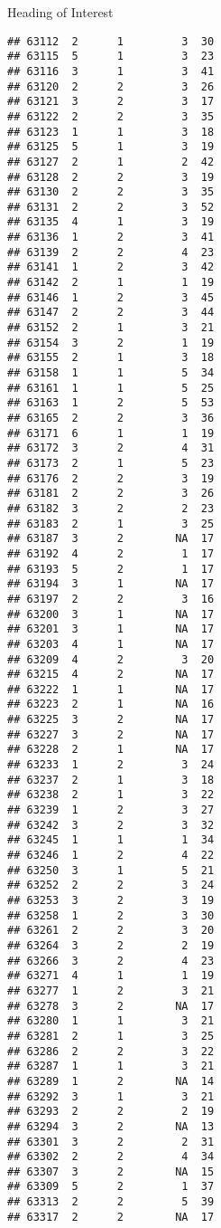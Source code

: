 \documentclass[
  ignorenonframetext,
]{beamer}
\begin{document}
\begin{frame}[fragile]{Heading of Interest}
\begin{verbatim}
## 63112  2      1         3  30
## 63115  5      1         3  23
## 63116  3      1         3  41
## 63120  2      2         3  26
## 63121  3      2         3  17
## 63122  2      2         3  35
## 63123  1      1         3  18
## 63125  5      1         3  19
## 63127  2      1         2  42
## 63128  2      2         3  19
## 63130  2      2         3  35
## 63131  2      2         3  52
## 63135  4      1         3  19
## 63136  1      2         3  41
## 63139  2      2         4  23
## 63141  1      2         3  42
## 63142  2      1         1  19
## 63146  1      2         3  45
## 63147  2      2         3  44
## 63152  2      1         3  21
## 63154  3      2         1  19
## 63155  2      1         3  18
## 63158  1      1         5  34
## 63161  1      1         5  25
## 63163  1      2         5  53
## 63165  2      2         3  36
## 63171  6      1         1  19
## 63172  3      2         4  31
## 63173  2      1         5  23
## 63176  2      2         3  19
## 63181  2      2         3  26
## 63182  3      2         2  23
## 63183  2      1         3  25
## 63187  3      2        NA  17
## 63192  4      2         1  17
## 63193  5      2         1  17
## 63194  3      1        NA  17
## 63197  2      2         3  16
## 63200  3      1        NA  17
## 63201  3      1        NA  17
## 63203  4      1        NA  17
## 63209  4      2         3  20
## 63215  4      2        NA  17
## 63222  1      1        NA  17
## 63223  2      1        NA  16
## 63225  3      2        NA  17
## 63227  3      2        NA  17
## 63228  2      1        NA  17
## 63233  1      2         3  24
## 63237  2      1         3  18
## 63238  2      1         3  22
## 63239  1      2         3  27
## 63242  3      2         3  32
## 63245  1      1         1  34
## 63246  1      2         4  22
## 63250  3      1         5  21
## 63252  2      2         3  24
## 63253  3      2         3  19
## 63258  1      2         3  30
## 63261  2      2         3  20
## 63264  3      2         2  19
## 63266  3      2         4  23
## 63271  4      1         1  19
## 63277  1      2         3  21
## 63278  3      2        NA  17
## 63280  1      1         3  21
## 63281  2      1         3  25
## 63286  2      2         3  22
## 63287  1      1         3  21
## 63289  1      2        NA  14
## 63292  3      1         3  21
## 63293  2      2         2  19
## 63294  3      2        NA  13
## 63301  3      2         2  31
## 63302  2      2         4  34
## 63307  3      2        NA  15
## 63309  5      2         1  37
## 63313  2      2         5  39
## 63317  2      2        NA  17

\end{verbatim}
\end{frame}
\end{document}
